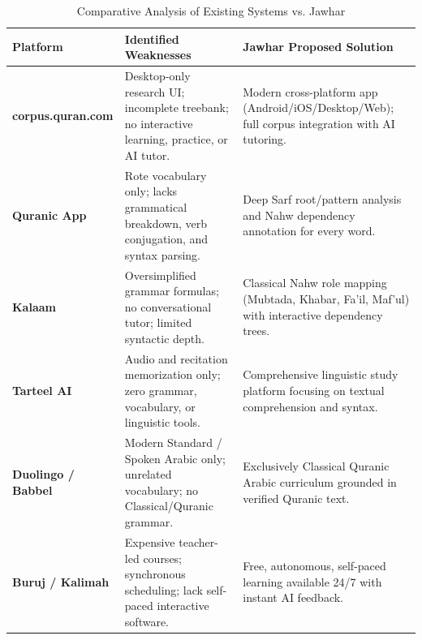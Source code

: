 \documentclass[A4paper,12pt]{article}
\begin{document}
\begin{table}[h!]
    \centering
    \small
    \caption{Comparative Analysis of Existing Systems vs. Jawhar}
    \label{tab:comparison}
    \begin{tabular}{|p{}|p{}|p{}|}
    \hline
    \textbf{Platform} & \textbf{Identified Weaknesses} & \textbf{Jawhar Proposed Solution} \\
    \hline
    \textbf{corpus.quran.com} & Desktop-only research UI; incomplete treebank; no interactive learning, practice, or AI tutor. & Modern cross-platform app (Android/iOS/Desktop/Web); full corpus integration with AI tutoring. \\
    \hline
    \textbf{Quranic App} & Rote vocabulary only; lacks grammatical breakdown, verb conjugation, and syntax parsing. & Deep Sarf root/pattern analysis and Nahw dependency annotation for every word. \\
    \hline
    \textbf{Kalaam} & Oversimplified grammar formulas; no conversational tutor; limited syntactic depth. & Classical Nahw role mapping (Mubtada, Khabar, Fa'il, Maf'ul) with interactive dependency trees. \\
    \hline
    \textbf{Tarteel AI} & Audio and recitation memorization only; zero grammar, vocabulary, or linguistic tools. & Comprehensive linguistic study platform focusing on textual comprehension and syntax. \\
    \hline
    \textbf{Duolingo / Babbel} & Modern Standard / Spoken Arabic only; unrelated vocabulary; no Classical/Quranic grammar. & Exclusively Classical Quranic Arabic curriculum grounded in verified Quranic text. \\
    \hline
    \textbf{Buruj / Kalimah} & Expensive teacher-led courses; synchronous scheduling; lack self-paced interactive software. & Free, autonomous, self-paced learning available 24/7 with instant AI feedback. \\
    \hline
    \end{tabular}
\end{table}
\end{document}
